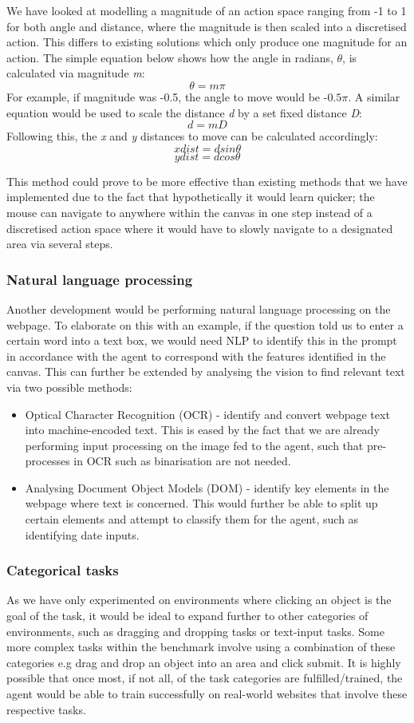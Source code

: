\documentclass[conference]{IEEEtran}
\begin{document}
We have looked at modelling a magnitude of an action space ranging from -1 to 1 for both angle and distance, where the magnitude is then scaled into a discretised action. This differs to existing solutions which only produce one magnitude for an action. The simple equation below shows how the angle in radians, \( \theta \), is calculated via magnitude \textit{m}:
\[ \theta=m\pi \]
For example, if magnitude was -0.5, the angle to move would be -\( 0.5\pi \). A similar equation would be used to scale the distance \textit{d} by a set fixed distance \textit{D}:
\[ d=mD \]
 Following this, the \textit{x} and \textit{y} distances to move can be calculated accordingly:
 \[ xdist=dsin\theta \]
 \[ ydist=dcos\theta \]
 
This method could prove to be more effective than existing methods that we have implemented due to the fact that hypothetically it would learn quicker; the mouse can navigate to anywhere within the canvas in one step instead of a discretised action space where it would have to slowly navigate to a designated area via several steps.

\subsubsection{Natural language processing}
Another development would be performing natural language processing on the webpage. To elaborate on this with an example, if the question told us to enter a certain word into a text box, we would need NLP to identify this in the prompt in accordance with the agent to correspond with the features identified in the canvas. This can further be extended by analysing the vision to find relevant text via two possible methods:
\indent
\begin{itemize}
\item Optical Character Recognition (OCR) - identify and convert webpage text into machine-encoded text. This is eased by the fact that we are already performing input processing on the image fed to the agent, such that pre-processes in OCR such as binarisation are not needed. 
\item Analysing Document Object Models (DOM) - identify key elements in the webpage where text is concerned. This would further be able to split up certain elements and attempt to classify them for the agent, such as identifying date inputs.
\end{itemize}

\subsubsection{Categorical tasks}
As we have only experimented on environments where clicking an object is the goal of the task, it would be ideal to expand further to other categories of environments, such as dragging and dropping tasks or text-input tasks. Some more complex tasks within the benchmark involve using a combination of these categories e.g drag and drop an object into an area and click submit. It is highly possible that once most, if not all, of the task categories are fulfilled/trained, the agent would be able to train successfully on real-world websites that involve these respective tasks.
\end{document}
